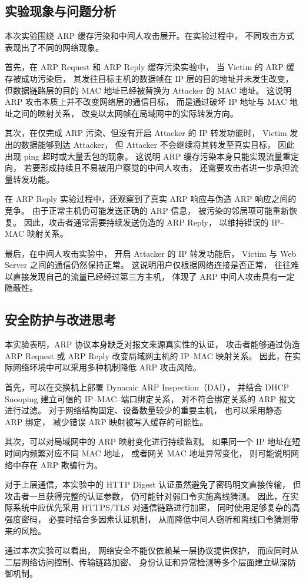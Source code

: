 \subsection{实验现象与问题分析}

本次实验围绕 ARP 缓存污染和中间人攻击展开。在实验过程中，
不同攻击方式表现出了不同的网络现象。

首先，在 ARP Request 和 ARP Reply 缓存污染实验中，
当 Victim 的 ARP 缓存被成功污染后，
其发往目标主机的数据帧在 IP 层的目的地址并未发生改变，
但数据链路层的目的 MAC 地址已经被替换为 Attacker 的 MAC 地址。
这说明 ARP 攻击本质上并不改变网络层的通信目标，
而是通过破坏 IP 地址与 MAC 地址之间的映射关系，
改变以太网帧在局域网中的实际转发方向。

其次，在仅完成 ARP 污染、但没有开启 Attacker 的 IP 转发功能时，
Victim 发出的数据能够到达 Attacker，
但 Attacker 不会继续将其转发至真实目标，
因此出现 ping 超时或大量丢包的现象。
这说明 ARP 缓存污染本身只能实现流量重定向，
若要形成持续且不易被用户察觉的中间人攻击，
还需要攻击者进一步承担流量转发功能。

在 ARP Reply 实验过程中，还观察到了真实 ARP 响应与伪造 ARP 响应之间的竞争。
由于正常主机仍可能发送正确的 ARP 信息，
被污染的邻居项可能重新恢复。
因此，攻击者通常需要持续发送伪造的 ARP Reply，
以维持错误的 IP--MAC 映射关系。

最后，在中间人攻击实验中，
开启 Attacker 的 IP 转发功能后，
Victim 与 Web Server 之间的通信仍然保持正常。
这说明用户仅根据网络连接是否正常，
往往难以直接发现自己的流量已经经过第三方主机，
体现了 ARP 中间人攻击具有一定隐蔽性。

\subsection{安全防护与改进思考}

本实验表明，ARP 协议本身缺乏对报文来源真实性的认证，
攻击者能够通过伪造 ARP Request 或 ARP Reply
改变局域网主机的 IP--MAC 映射关系。
因此，在实际网络环境中可以采用多种机制降低 ARP 攻击风险。

首先，可以在交换机上部署 Dynamic ARP Inspection（DAI），
并结合 DHCP Snooping 建立可信的 IP--MAC--端口绑定关系，
对不符合绑定关系的 ARP 报文进行过滤。
对于网络结构固定、设备数量较少的重要主机，
也可以采用静态 ARP 绑定，
减少错误 ARP 映射被写入缓存的可能性。

其次，可以对局域网中的 ARP 映射变化进行持续监测。
如果同一个 IP 地址在短时间内频繁对应不同 MAC 地址，
或者网关 MAC 地址异常变化，
则可能说明网络中存在 ARP 欺骗行为。

对于上层通信，本实验中的 HTTP Digest 认证虽然避免了密码明文直接传输，
但攻击者一旦获得完整的认证参数，
仍可能针对弱口令实施离线猜测。
因此，在实际系统中应优先采用 HTTPS/TLS 对通信链路进行加密，
同时使用足够复杂的高强度密码，
必要时结合多因素认证机制，
从而降低中间人窃听和离线口令猜测带来的风险。

通过本次实验可以看出，
网络安全不能仅依赖某一层协议提供保护，
而应同时从二层网络访问控制、传输链路加密、
身份认证和异常检测等多个层面建立纵深防御机制。
